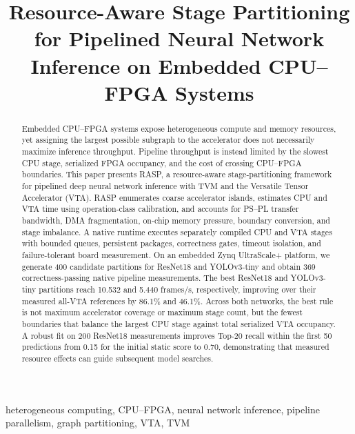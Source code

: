 \documentclass[conference]{IEEEtran}
\newcommand{\framework}{RASP}
\begin{document}
\title{Resource-Aware Stage Partitioning for Pipelined Neural Network Inference on Embedded CPU--FPGA Systems}

\author{
}

\maketitle

\begin{abstract}
Embedded CPU--FPGA systems expose heterogeneous compute and memory resources, yet assigning the largest possible subgraph to the accelerator does not necessarily maximize inference throughput. Pipeline throughput is instead limited by the slowest CPU stage, serialized FPGA occupancy, and the cost of crossing CPU--FPGA boundaries. This paper presents \framework, a resource-aware stage-partitioning framework for pipelined deep neural network inference with TVM and the Versatile Tensor Accelerator (VTA). \framework{} enumerates coarse accelerator islands, estimates CPU and VTA time using operation-class calibration, and accounts for PS--PL transfer bandwidth, DMA fragmentation, on-chip memory pressure, boundary conversion, and stage imbalance. A native runtime executes separately compiled CPU and VTA stages with bounded queues, persistent packages, correctness gates, timeout isolation, and failure-tolerant board measurement. On an embedded Zynq UltraScale+ platform, we generate 400 candidate partitions for ResNet18 and YOLOv3-tiny and obtain 369 correctness-passing native pipeline measurements. The best ResNet18 and YOLOv3-tiny partitions reach 10.532 and 5.440 frames/s, respectively, improving over their measured all-VTA references by 86.1\% and 46.1\%. Across both networks, the best rule is not maximum accelerator coverage or maximum stage count, but the fewest boundaries that balance the largest CPU stage against total serialized VTA occupancy. A robust fit on 200 ResNet18 measurements improves Top-20 recall within the first 50 predictions from 0.15 for the initial static score to 0.70, demonstrating that measured resource effects can guide subsequent model searches.
\end{abstract}

\begin{IEEEkeywords}
heterogeneous computing, CPU--FPGA, neural network inference, pipeline parallelism, graph partitioning, VTA, TVM
\end{IEEEkeywords}
\end{document}
